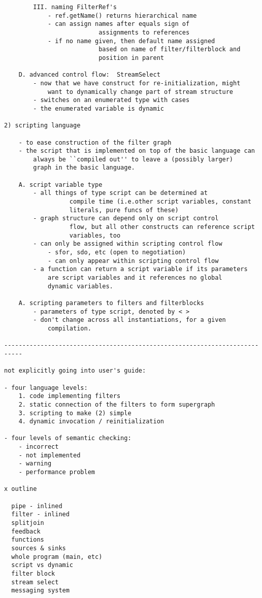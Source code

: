\documentclass[draft]{article}
\begin{document}
\begin{verbatim}
		III. naming FilterRef's
			- ref.getName() returns hierarchical name
			- can assign names after equals sign of
                          assignments to references
			- if no name given, then default name assigned
                          based on name of filter/filterblock and
                          position in parent

	D. advanced control flow:  StreamSelect
		- now that we have construct for re-initialization, might
			want to dynamically change part of stream structure
		- switches on an enumerated type with cases
		- the enumerated variable is dynamic

2) scripting language

	- to ease construction of the filter graph
	- the script that is implemented on top of the basic language can
		always be ``compiled out'' to leave a (possibly larger) 
		graph in the basic language.

	A. script variable type
		- all things of type script can be determined at
                  compile time (i.e.other script variables, constant
                  literals, pure funcs of these)
		- graph structure can depend only on script control
                  flow, but all other constructs can reference script
                  variables, too
		- can only be assigned within scripting control flow
			- sfor, sdo, etc (open to negotiation)
			- can only appear within scripting control flow
		- a function can return a script variable if its parameters
			are script variables and it references no global
			dynamic variables.  

	A. scripting parameters to filters and filterblocks
		- parameters of type script, denoted by < >
		- don't change across all instantiations, for a given 
			compilation.

---------------------------------------------------------------------------

not explicitly going into user's guide:

- four language levels:
	1. code implementing filters
	2. static connection of the filters to form supergraph
	3. scripting to make (2) simple
	4. dynamic invocation / reinitialization

- four levels of semantic checking:
	- incorrect
	- not implemented
	- warning
	- performance problem

x outline

  pipe - inlined
  filter - inlined
  splitjoin
  feedback
  functions
  sources & sinks
  whole program (main, etc)
  script vs dynamic
  filter block
  stream select
  messaging system


\end{verbatim}
\end{document}
